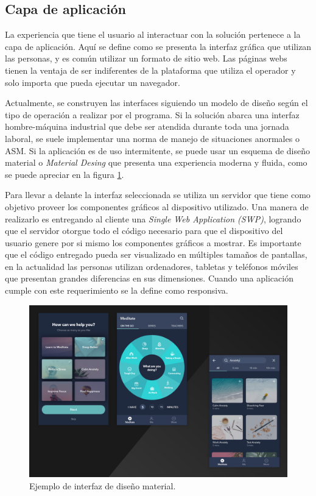 \subsection{Capa de aplicación}
La experiencia que tiene el usuario al interactuar con la solución pertenece a la capa de aplicación.
Aquí se define como se presenta la interfaz gráfica que utilizan las personas, y es común utilizar un formato de sitio web.
Las páginas webs tienen la ventaja de ser indiferentes de la plataforma que utiliza el operador y solo importa que pueda ejecutar un navegador.

Actualmente, se construyen las interfaces siguiendo un modelo de diseño según el tipo de operación a realizar por el programa.
Si la solución abarca una interfaz hombre-máquina industrial que debe ser atendida durante toda una jornada laboral, se suele implementar una norma de manejo de situaciones anormales o ASM.
Si la aplicación es de uso intermitente, se puede usar un esquema de diseño material o \emph{Material Desing} que presenta una experiencia moderna y fluida, como se puede apreciar en la figura \ref{fig:ch1MaterialDesign}.

Para llevar a delante la interfaz seleccionada se utiliza un servidor que tiene como objetivo proveer los componentes gráficos al dispositivo utilizado.
Una manera de realizarlo es entregando al cliente una \emph{Single Web Application (SWP)}, logrando que el servidor otorgue todo el código necesario para que el dispositivo del usuario genere por si mismo los componentes gráficos a mostrar.
Es importante que el código entregado pueda ser visualizado en múltiples tamaños de pantallas, en la actualidad las personas utilizan ordenadores, tabletas y teléfonos móviles que presentan grandes diferencias en sus dimensiones.
Cuando una aplicación cumple con este requerimiento se la define como responsiva.

\begin{figure}[h]
	\centering
	\includegraphics[width=\textwidth]{./Figures/ch1MaterialDesign.jpg}
	\caption{Ejemplo de interfaz de diseño material. \citep{WEBSITE:Material}}
	\label{fig:ch1MaterialDesign}
\end{figure}

